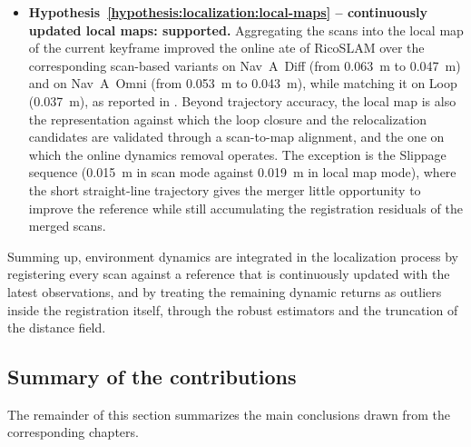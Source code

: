\begin{itemize}
storage, and the classical \gls{icp} baselines under a single data structure.
The precomputed point-to-point variant
$\mathcal{D}_\mathrm{p2p}(\mathcal{M}_1)$ lowered the odometric drift
relative to both of its analytical point-to-point counterparts in most
configurations, reaching drift levels competitive with the point-to-plane
formulations without ever estimating surface normals, and produced less
overconfident information matrices in degenerate scenes.
Dynamic and spurious observations are handled inside the optimization by the
Cauchy robustifier and by the truncation of the distance field at
$d_{\max}$, which bounds the residual and cancels its gradient beyond the
truncation band;
\item \textbf{Hypothesis~\ref{hypothesis:localization:local-maps} --
continuously updated local maps: supported.}
Aggregating the scans into the local map of the current keyframe improved the
online \gls{ate} of RicoSLAM over the corresponding scan-based variants on
Nav~A~Diff (from \SI{0.063}{\metre} to \SI{0.047}{\metre}) and on Nav~A~Omni
(from \SI{0.053}{\metre} to \SI{0.043}{\metre}), while matching it on Loop
(\SI{0.037}{\metre}), as reported in .
Beyond trajectory accuracy, the local map is also the representation against
which the loop closure and the relocalization candidates are validated
through a scan-to-map alignment, and the one on which the online dynamics
removal operates. The exception is the Slippage sequence
(\SI{0.015}{\metre} in scan mode against \SI{0.019}{\metre} in local map
mode), where the short straight-line trajectory gives the merger little
opportunity to improve the reference while still accumulating the
registration residuals of the merged scans.
\end{itemize}

Summing up, environment dynamics are integrated in the localization process
by registering every scan against a reference that is continuously updated
with the latest observations, and by treating the remaining dynamic returns
as outliers inside the registration itself, through the robust estimators and
the truncation of the distance field.

\subsection{Summary of the contributions}\label{sec:conclusions:summary}

The remainder of this section summarizes the main conclusions drawn from
the corresponding chapters.

